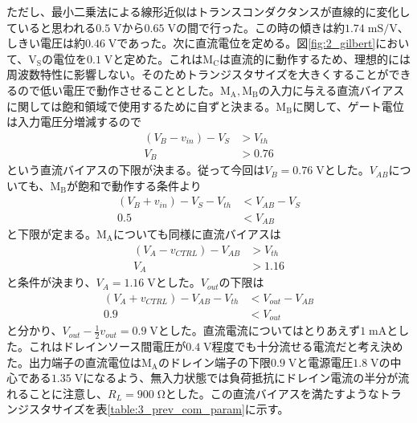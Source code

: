             ただし、最小二乗法による線形近似はトランスコンダクタンスが直線的に変化していると思われる$0.5\;\mathrm{V}$から$0.65\;\mathrm{V}$の間で行った。この時の傾きは約$1.74\;\mathrm{mS/V}$、しきい電圧は約$0.46\;\mathrm{V}$であった。次に直流電位を定める。図\ref{fig:2_gilbert}において、$\mathrm{V_{S}}$の電位を$0.1\;\mathrm{V}$と定めた。これは$\mathrm{M_{C}}$は直流的に動作するため、理想的には周波数特性に影響しない。そのためトランジスタサイズを大きくすることができるので低い電圧で動作させることとした。$\mathrm{M_{A},M_{B}}$の入力に与える直流バイアスに関しては飽和領域で使用するために自ずと決まる。$\mathrm{M_{B}}$に関して、ゲート電位は入力電圧分増減するので
            \begin{align*}
                \left( V_{B}-v_{in} \right) -V_{S} &> V_{th}  \\
                V_{B} &> 0.76
            \end{align*}
            という直流バイアスの下限が決まる。従って今回は$V_{B}=0.76\;\mathrm{V}$とした。$V_{AB}$についても、$\mathrm{M_{B}}$が飽和で動作する条件より
            \begin{align*}
                \left( V_{B}+v_{in} \right) - V_{S} -V_{th} &< V_{AB} - V_{S}   \\
                0.5 &< V_{AB}  
            \end{align*}
            と下限が定まる。$\mathrm{M_{A}}$についても同様に直流バイアスは
            \begin{align*}
                \left( V_{A}-v_{CTRL} \right) -V_{AB} &> V_{th}  \\
                V_{A} &> 1.16
            \end{align*}
            と条件が決まり、$V_{A}=1.16\;\mathrm{V}$とした。$V_{out}$の下限は
            \begin{align*}
                \left( V_{A}+v_{CTRL} \right) - V_{AB} -V_{th} &< V_{out} - V_{AB}   \\
                0.9 &< V_{out}
            \end{align*}
            と分かり、$V_{out}-\frac{1}{2}v_{out}=0.9\;\mathrm{V}$とした。直流電流についてはとりあえず$1\;\mathrm{mA}$とした。これはドレインソース間電圧が$0.4\;\mathrm{V}$程度でも十分流せる電流だと考え決めた。出力端子の直流電位は$\mathrm{M_{A}}$のドレイン端子の下限$0.9\;\mathrm{V}$と電源電圧$1.8\;\mathrm{V}$の中心である$1.35\;\mathrm{V}$になるよう、無入力状態では負荷抵抗にドレイン電流の半分が流れることに注意し、$R_{L}=900\;\mathrm{\Omega}$とした。この直流バイアスを満たすようなトランジスタサイズを表\ref{table:3_prev_com_param}に示す。\par

